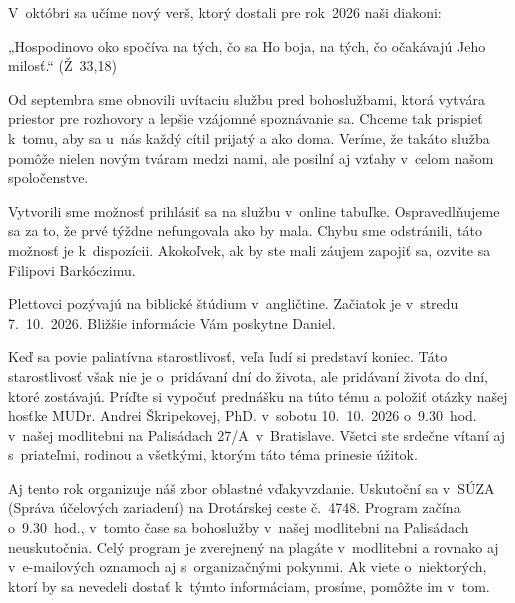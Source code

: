 \def\velkostpisma{9}
\def\velkostriadku{12}





V~októbri sa učíme nový verš, ktorý dostali pre rok~2026 naši diakoni:

„Hospodinovo oko spočíva na tých, čo sa Ho boja, na tých, čo očakávajú Jeho milosť.“ (Ž~33,18)


Od septembra sme obnovili uvítaciu službu pred bohoslužbami, ktorá vytvára priestor pre rozhovory a lepšie vzájomné spoznávanie sa.
Chceme tak prispieť k~tomu, aby sa u~nás každý cítil prijatý a ako doma. Veríme, že takáto služba pomôže nielen novým tváram medzi nami, ale posilní aj vzťahy v~celom našom spoločenstve.

Vytvorili sme možnosť prihlásiť sa na službu v~online tabuľke.
Ospravedlňujeme sa za to, že prvé týždne nefungovala ako by mala. Chybu sme odstránili, táto možnosť je k~dispozícii. Akokoľvek, ak by ste mali záujem zapojiť sa, ozvite sa Filipovi Barkóczimu.


Plettovci pozývajú na biblické štúdium v~angličtine.
Začiatok je v~stredu 7.~10.~2026.
Bližšie informácie Vám poskytne Daniel.


Keď sa povie paliatívna starostlivosť, veľa ľudí si predstaví koniec.
Táto starostlivosť však nie je o~pridávaní dní do života, ale pridávaní života do dní, ktoré zostávajú. Príďte si vypočuť prednášku na túto tému a položiť otázky našej hosťke MUDr. Andrei Škripekovej, PhD. v~sobotu 10.~10.~2026
o~9.30~hod. v~našej modlitebni na Palisádach 27/A~v~Bratislave.
Všetci ste srdečne vítaní aj s~priateľmi, rodinou a všetkými, ktorým táto téma prinesie úžitok.


Aj tento rok organizuje náš zbor oblastné vďakyvzdanie. Uskutoční sa v~SÚZA (Správa účelových zariadení) na Drotárskej ceste č.~4748.
Program začína o~9.30~hod., v~tomto čase sa bohoslužby v~našej modlitebni na Palisádach neuskutočnia.
Celý program  je zverejnený na plagáte v~modlitebni a rovnako aj v~e-mailových oznamoch aj s~organizačnými pokynmi.
Ak viete o~niektorých, ktorí by sa nevedeli dostať k~týmto informáciam, prosíme, pomôžte im v~tom.


